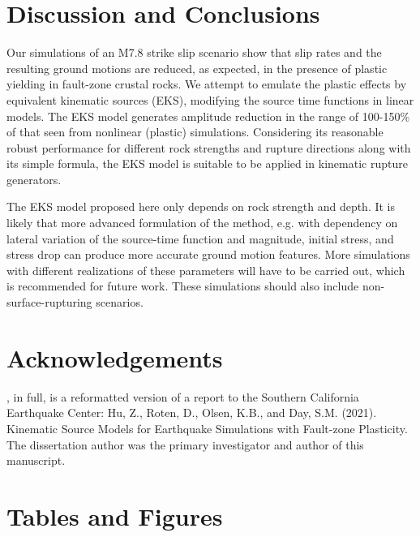 \section{Discussion and Conclusions}\label{eks:conclusions}
Our simulations of an M7.8 strike slip scenario show that slip rates and the resulting ground motions are reduced, as expected, in the presence of plastic yielding in fault-zone crustal rocks. We attempt to emulate the plastic effects by equivalent kinematic sources (EKS), modifying the source time functions in linear models. The EKS model generates amplitude reduction in the range of 100-150\% of that seen from nonlinear (plastic) simulations.
Considering its reasonable robust performance for different rock strengths and rupture directions along with its simple formula, the EKS model is suitable to be applied in kinematic rupture generators.

The EKS model proposed here only depends on rock strength and depth. It is likely that more advanced formulation of the method, e.g. with dependency on lateral variation of the source-time function and magnitude, initial stress, and stress drop can produce more accurate ground motion features. 
More simulations with different realizations of these parameters will have to be carried out, which is recommended for future work. These simulations should also include non-surface-rupturing scenarios.

\section*{Acknowledgements}

, in full, is a reformatted version of a report to the Southern California Earthquake Center: Hu, Z., Roten, D., Olsen, K.B., and Day, S.M. (2021). Kinematic Source Models for Earthquake Simulations with Fault-zone Plasticity. The dissertation author was the primary investigator and author of this manuscript.


\newpage
\section*{Tables and Figures}
%




